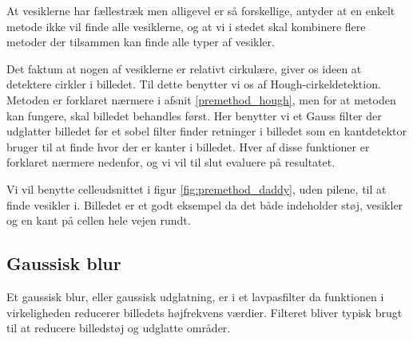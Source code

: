 At vesiklerne har fællestræk men alligevel er så forskellige, antyder at en enkelt metode ikke vil finde alle vesiklerne, og at vi i stedet skal kombinere flere metoder der tilsammen kan finde alle typer af vesikler.

Det faktum at nogen af vesiklerne er relativt cirkulære, giver os ideen at detektere cirkler i billedet. Til dette benytter vi os af Hough-cirkeldetektion. Metoden er forklaret nærmere i afsnit \ref{premethod_hough}, men for at metoden kan fungere, skal billedet behandles først. Her benytter vi et Gauss filter der udglatter billedet før et sobel filter finder retninger i billedet som en kantdetektor bruger til at finde hvor der er kanter i billedet. Hver af disse funktioner er forklaret nærmere nedenfor, og vi vil til slut evaluere på resultatet.

Vi vil benytte celleudsnittet i figur \ref{fig:premethod_daddy}, uden pilene, til at finde vesikler i. Billedet er et godt eksempel da det både indeholder støj, vesikler og en kant på cellen hele vejen rundt.

\subsection{Gaussisk blur}
Et gaussisk blur, eller gaussisk udglatning, er i et lavpasfilter da funktionen i virkeligheden reducerer billedets højfrekvens værdier. Filteret bliver typisk brugt til at reducere billedstøj og udglatte områder. 

